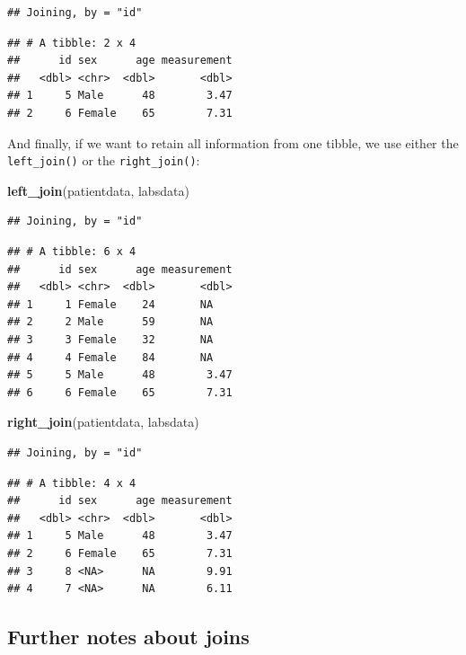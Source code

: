 \documentclass[
  12pt,
  krantz2]{krantz}
\makeatletter
\newenvironment{Shaded}{\begin{snugshade}}{\end{snugshade}}
\newcommand{\KeywordTok}[1]{\textcolor[rgb]{0.13,0.29,0.53}{\textbf{#1}}}
\newcommand{\NormalTok}[1]{#1}
\newenvironment{kframe}{%
\medskip{}
\setlength{\fboxsep}{.8em}
 \def\at@end@of@kframe{}%
 \ifinner\ifhmode%
  \def\at@end@of@kframe{\end{minipage}}%
  \begin{minipage}{\columnwidth}%
 \fi\fi%
 \def\FrameCommand##1{\hskip\@totalleftmargin \hskip-\fboxsep
 \colorbox{shadecolor}{##1}\hskip-\fboxsep
     \hskip-\linewidth \hskip-\@totalleftmargin \hskip\columnwidth}%
 \MakeFramed {\advance\hsize-\width
   \@totalleftmargin\z@ \linewidth\hsize
   \@setminipage}}%
 {\par\unskip\endMakeFramed%
 \at@end@of@kframe}
\renewenvironment{Shaded}{\begin{kframe}}{\end{kframe}}
\makeatother
\begin{document}
\begin{verbatim}
## Joining, by = "id"
\end{verbatim}

\begin{verbatim}
## # A tibble: 2 x 4
##      id sex      age measurement
##   <dbl> <chr>  <dbl>       <dbl>
## 1     5 Male      48        3.47
## 2     6 Female    65        7.31
\end{verbatim}

And finally, if we want to retain all information from one tibble, we use either the \texttt{left\_join()} or the \texttt{right\_join()}:

\begin{Shaded}
\begin{Highlighting}[]
\KeywordTok{left_join}\NormalTok{(patientdata, labsdata)}
\end{Highlighting}
\end{Shaded}

\begin{verbatim}
## Joining, by = "id"
\end{verbatim}

\begin{verbatim}
## # A tibble: 6 x 4
##      id sex      age measurement
##   <dbl> <chr>  <dbl>       <dbl>
## 1     1 Female    24       NA   
## 2     2 Male      59       NA   
## 3     3 Female    32       NA   
## 4     4 Female    84       NA   
## 5     5 Male      48        3.47
## 6     6 Female    65        7.31
\end{verbatim}

\begin{Shaded}
\begin{Highlighting}[]
\KeywordTok{right_join}\NormalTok{(patientdata, labsdata)}
\end{Highlighting}
\end{Shaded}

\begin{verbatim}
## Joining, by = "id"
\end{verbatim}

\begin{verbatim}
## # A tibble: 4 x 4
##      id sex      age measurement
##   <dbl> <chr>  <dbl>       <dbl>
## 1     5 Male      48        3.47
## 2     6 Female    65        7.31
## 3     8 <NA>      NA        9.91
## 4     7 <NA>      NA        6.11
\end{verbatim}

\hypertarget{further-notes-about-joins}{%
\subsection{Further notes about joins}\label{further-notes-about-joins}}
\end{document}

